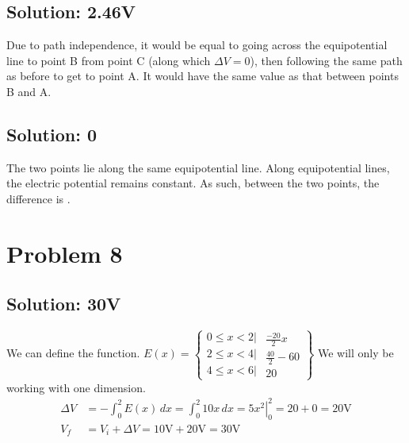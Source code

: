 \documentclass[12pt]{article}
\begin{document}
\subsection{Solution: 2.46V}
Due to path independence, it would be equal to going across the equipotential line to point B from point C (along which $\Delta V = 0$), then following the same path as before to get to point A.
It would have the same value as that between points B and A.

\subsection{Solution: 0}
The two points lie along the same equipotential line. 
Along equipotential lines, the electric potential remains constant.
As such, between the two points, the difference is .

\section{Problem 8}
\subsection{Solution: 30V}
We can define the function. 
\(E(x) = \left\{ \begin{matrix}
    0 \le x < 2| \\
    2 \le x < 4| \\
    4 \le x < 6| 
\end{matrix}
\begin{matrix}
    \frac{-20}{2}x\\
    \frac{40}{2} - 60\\
    20
\end{matrix} \right\}\)
We will only be working with one dimension.
\begin{align*}
    \Delta V &= -\int_{0}^{2} E(x)\,dx
        =   \int_0^2 10x\,dx
        =   \left. 5x^2 \right|_0^2
        =   20 + 0
        =   20 \unit{\volt}\\
    V_f &=  V_i + \Delta V
        =   10 \unit{\volt} + 20 \unit{\volt}
        =   \boxed{30 \unit{\volt}}
\end{align*}
\end{document}
